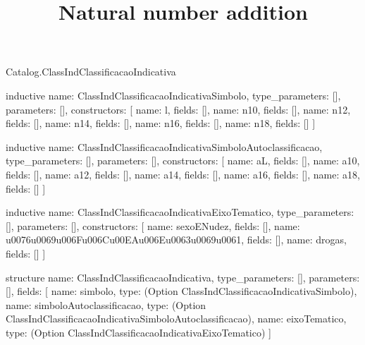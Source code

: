 \begin{lexlean}{Catalog.ClassIndClassificacaoIndicativa}
\title{Natural number addition}
\begin{semanticmodule}
inductive{
  name: ClassIndClassificacaoIndicativaSimbolo,
  type_parameters: [],
  parameters: [],
  constructors: [
    {name: l, fields: []},
    {name: n10, fields: []},
    {name: n12, fields: []},
    {name: n14, fields: []},
    {name: n16, fields: []},
    {name: n18, fields: []}
  ]
}

inductive{
  name: ClassIndClassificacaoIndicativaSimboloAutoclassificacao,
  type_parameters: [],
  parameters: [],
  constructors: [
    {name: aL, fields: []},
    {name: a10, fields: []},
    {name: a12, fields: []},
    {name: a14, fields: []},
    {name: a16, fields: []},
    {name: a18, fields: []}
  ]
}

inductive{
  name: ClassIndClassificacaoIndicativaEixoTematico,
  type_parameters: [],
  parameters: [],
  constructors: [
    {name: sexoENudez, fields: []},
    {name: u0076u0069u006Fu006Cu00EAu006Eu0063u0069u0061, fields: []},
    {name: drogas, fields: []}
  ]
}

structure{
  name: ClassIndClassificacaoIndicativa,
  type_parameters: [],
  parameters: [],
  fields: [
    {name: simbolo, type: (Option ClassIndClassificacaoIndicativaSimbolo)},
    {name: simboloAutoclassificacao, type: (Option ClassIndClassificacaoIndicativaSimboloAutoclassificacao)},
    {name: eixoTematico, type: (Option ClassIndClassificacaoIndicativaEixoTematico)}
  ]
}
\end{semanticmodule}
\end{lexlean}
